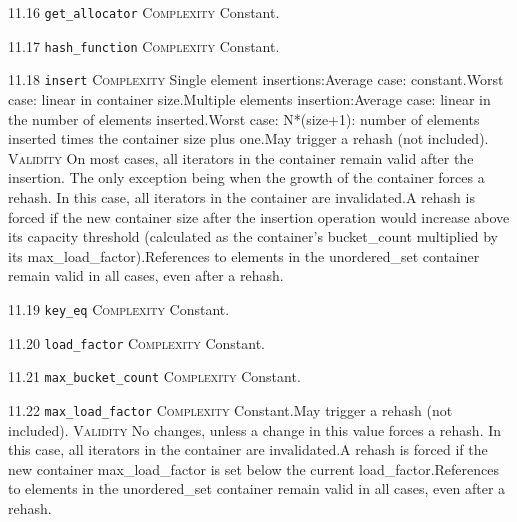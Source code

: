 \noindent\textcolor{cgreen}{11.16 \texttt{get\_allocator}} \textsc{Complexity} Constant. \vspace{0.5em}

\noindent\textcolor{cgreen}{11.17 \texttt{hash\_function}} \textsc{Complexity} Constant. \vspace{0.5em}

\noindent\textcolor{corange}{11.18 \texttt{insert}} \textsc{Complexity} Single element insertions:Average case: constant.Worst case: linear in container size.Multiple elements insertion:Average case: linear in the number of elements inserted.Worst case: N*(size+1): number of elements inserted times the container size plus one.May trigger a rehash (not included). \textsc{Validity} On most cases, all iterators in the container remain valid after the insertion. The only exception being when the growth of the container forces a rehash. In this case, all iterators in the container are invalidated.A rehash is forced if the new container size after the insertion operation would increase above its capacity threshold (calculated as the container's bucket\_count multiplied by its max\_load\_factor).References to elements in the unordered\_set container remain valid in all cases, even after a rehash.\vspace{0.5em}

\noindent\textcolor{cgreen}{11.19 \texttt{key\_eq}} \textsc{Complexity} Constant. \vspace{0.5em}

\noindent\textcolor{cgreen}{11.20 \texttt{load\_factor}} \textsc{Complexity} Constant. \vspace{0.5em}

\noindent\textcolor{cgreen}{11.21 \texttt{max\_bucket\_count}} \textsc{Complexity} Constant. \vspace{0.5em}

\noindent\textcolor{cgreen}{11.22 \texttt{max\_load\_factor}} \textsc{Complexity} Constant.May trigger a rehash (not included). \textsc{Validity} No changes, unless a change in this value forces a rehash. In this case, all iterators in the container are invalidated.A rehash is forced if the new container max\_load\_factor is set below the current load\_factor.References to elements in the unordered\_set container remain valid in all cases, even after a rehash.\vspace{0.5em}

